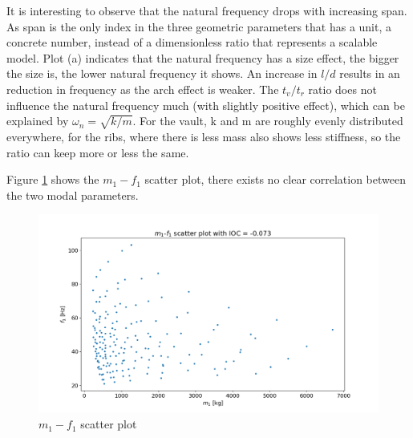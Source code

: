 It is interesting to observe that the natural frequency drops with increasing span. As span is the only index in the three geometric parameters that has a unit, a concrete number, instead of a dimensionless ratio that represents a scalable model. Plot (a) indicates that the natural frequency has a size effect, the bigger the size is, the lower natural frequency it shows. An increase in $l/d$ results in an reduction in frequency as the arch effect is weaker. The $t_v/t_r$ ratio does not influence the natural frequency much (with slightly positive effect), which can be explained by $\omega_n=\sqrt{k/m}$. For the vault, k and m are roughly evenly distributed everywhere, for the ribs, where there is less mass also shows less stiffness, so the ratio can keep more or less the same. 

Figure \ref{fig:m1_f1} shows the $m_1-f_1$ scatter plot, there exists no clear correlation between the two modal parameters.

\begin{figure}[H]
\centering
\includegraphics[width=1\textwidth]{images/m1_f1}
\caption{$m_1 - f_1$ scatter plot}
\label{fig:m1_f1}
\end{figure}



